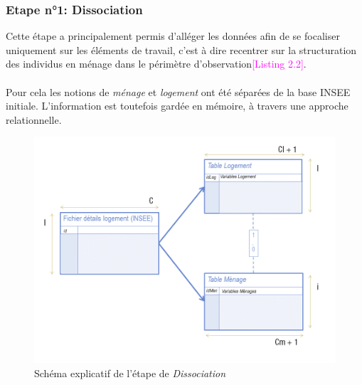 \documentclass{bredele}
\begin{document}
\subsubsection{Etape n°1: \Large{Dissociation}}
Cette étape a principalement permis d'alléger les données afin de se focaliser uniquement sur les éléments de travail, c'est à dire recentrer sur la structuration des individus en ménage dans le périmètre d'observation\textcolor{magenta}{[Listing 2.2]}.
\\\\
Pour cela les notions de \textit{ménage} et \textit{logement} ont été séparées de la base INSEE initiale. L'information est toutefois gardée en mémoire, à travers une approche relationnelle.
\begin{figure}\centering
\includegraphics[width=\textwidth]{PROCESSBDD_1}
\caption{Schéma explicatif de l'étape de \textit{Dissociation}}
\end{figure}
\newpage
\end{document}
